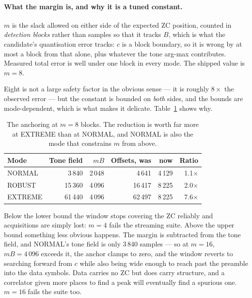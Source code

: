 \paragraph{What the margin is, and why it is a tuned constant.}
$m$ is the slack allowed on either side of the expected ZC position,
counted in \emph{detection blocks} rather than samples so that it tracks
$B$, which is what the candidate's quantisation error tracks: $c$ is a
block boundary, so it is wrong by at most a block from that alone, plus
whatever the tone arg-max contributes. Measured total error is well
under one block in every mode. The shipped value is $m=8$.

Eight is not a large safety factor in the obvious sense --- it is
roughly $8\times$ the observed error --- but the constant is bounded on
\emph{both} sides, and the bounds are mode-dependent, which is what
makes it delicate. Table~\ref{tab:zcmargin} shows why.

\begin{table}[htbp]
    \centering
    \caption{The anchoring at $m=8$ blocks. The reduction is worth far
             more at EXTREME than at NORMAL, and NORMAL is also the mode
             that constrains $m$ from above.}
    \label{tab:zcmargin}
    \small
    \begin{tabular}{@{}lrrrrr@{}}
    \toprule
    \textbf{Mode} & \textbf{Tone field} & \textbf{$mB$} &
    \textbf{Offsets, was} & \textbf{now} & \textbf{Ratio} \\
    \midrule
    NORMAL  & 3\,840  & 2\,048 & 4\,641  & 4\,129 & 1.1$\times$ \\
    ROBUST  & 15\,360 & 4\,096 & 16\,417 & 8\,225 & 2.0$\times$ \\
    EXTREME & 61\,440 & 4\,096 & 62\,497 & 8\,225 & 7.6$\times$ \\
    \bottomrule
    \end{tabular}
\end{table}

Below the lower bound the window stops covering the ZC reliably and
acquisitions are simply lost: $m=4$ fails the streaming suite. Above the
upper bound something less obvious happens. The margin is subtracted
from the tone field, and NORMAL's tone field is only 3\,840 samples ---
so at $m=16$, $mB = 4\,096$ exceeds it, the anchor clamps to zero, and
the window reverts to searching forward from $c$ while also being wide
enough to reach past the preamble into the data symbols. Data carries
no ZC but does carry structure, and a correlator given more places to
find a peak will eventually find a spurious one. $m=16$ fails the suite
too.

